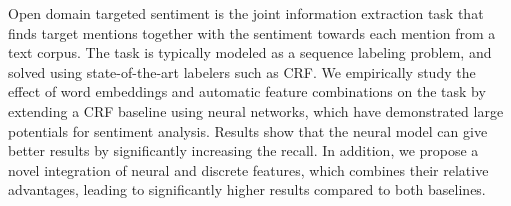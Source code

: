 Open domain targeted sentiment is the joint information extraction task that finds target mentions together with the sentiment towards each mention from a text corpus. The task is typically modeled as a sequence labeling problem, and solved using state-of-the-art labelers such as CRF. We empirically study the effect of word embeddings and automatic feature combinations on the task by extending a CRF baseline using neural networks, which have demonstrated large potentials for sentiment analysis. Results show that the neural model can give better results by significantly increasing the recall. In addition, we propose a novel integration of neural and discrete features, which combines their relative advantages, leading to significantly higher results compared to both baselines.
